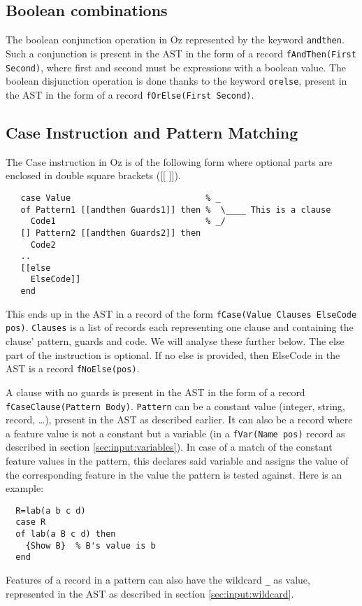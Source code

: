 \documentclass[a4paper]{memoir}
\begin{document}
\subsection{Boolean combinations}\label{sec:input:booleancombinations}
The boolean conjunction operation in Oz represented by the keyword \lstinline!andthen!. Such a conjunction is present in the AST in the form of a record \lstinline!fAndThen(First Second)!, where first and second must be expressions with a boolean value.
The boolean disjunction operation is done thanks to the keyword \lstinline!orelse!, present in the AST in the form of a record \lstinline!fOrElse(First Second)!.
\subsection{Case Instruction and Pattern Matching}\label{sec:input:patternmatching}
The Case instruction in Oz is of the following form where optional parts are enclosed in double square brackets ([[ ]]).
\begin{lstlisting}
   case Value                           % _
   of Pattern1 [[andthen Guards1]] then %  \____ This is a clause
     Code1                              % _/
   [] Pattern2 [[andthen Guards2]] then
     Code2
   ..
   [[else
     ElseCode]]
   end
\end{lstlisting}
This ends up in the AST in a record of the form \lstinline!fCase(Value Clauses ElseCode pos)!.
\lstinline!Clauses! is a list of records each representing one clause and containing the clause' pattern, guards and code. We will analyse these further below.
The else part of the instruction is optional. If no else is provided, then ElseCode in the AST is a record \lstinline!fNoElse(pos)!.

A clause with no guards is present in the AST in the form of a record \lstinline!fCaseClause(Pattern Body)!. \lstinline!Pattern! can be a constant value (integer, string, record, \ldots), present in the AST as described earlier. It can also be a record where a feature value is not a constant but a variable (in a \lstinline!fVar(Name pos)! record as described in section \ref{sec:input:variables}). In case of a match of the constant feature values in the pattern, this declares said variable and assigns the value of the corresponding feature in the value the pattern is tested against. Here is an example:
\begin{lstlisting}
  R=lab(a b c d)
  case R
  of lab(a B c d) then
    {Show B}  % B's value is b
  end
\end{lstlisting}
Features of a record in a pattern can also have the wildcard \lstinline!_! as value, represented in the AST as described in section \ref{sec:input:wildcard}.
\end{document}
